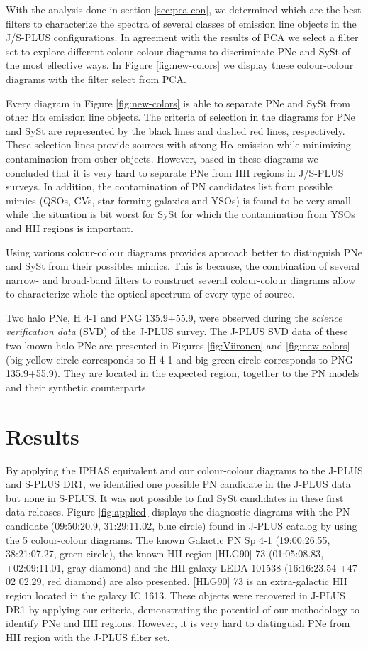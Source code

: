 \documentclass{article}
\newcommand\ha{\ensuremath{\mathrm{H\alpha}}}
\begin{document}
 With the analysis done in section \ref{sec:pca-con}, we determined which are the best filters to characterize the spectra of several classes of emission line objects in the J/S-PLUS configurations. In agreement with the results of PCA we select a filter set to explore different colour-colour diagrams to discriminate PNe and SySt of the most effective ways. In Figure \ref{fig:new-colors} we display these colour-colour diagrams with the filter select from PCA.

Every diagram in Figure \ref{fig:new-colors} is able to separate  PNe and SySt from other \ha{} emission line objects. The criteria of selection in the diagrams for PNe and SySt are represented by the black lines and  dashed red lines, respectively. These selection lines provide sources with strong \ha{} emission while minimizing contamination from other objects. However, based in these diagrams we concluded that it is very hard to separate PNe from HII regions in J/S-PLUS surveys. In addition, the contamination of PN candidates list from possible mimics (QSOs, CVs, star forming galaxies and YSOs) is found to be very small while the situation is bit worst for SySt for which the contamination from YSOs and HII regions is important.

 Using various colour-colour diagrams provides approach better to distinguish PNe and SySt from their possibles mimics. This is because, the combination of several  narrow- and broad-band filters to construct several colour-colour diagrams allow to characterize whole the optical spectrum of every type of source. 

Two halo PNe, H 4-1 and PNG 135.9+55.9, were observed during the \textit{science verification data} (SVD) of the J-PLUS survey. The J-PLUS SVD data of these two known halo PNe are presented in Figures \ref{fig:Viironen} and \ref{fig:new-colors} (big yellow circle corresponds to H 4-1 and  big green circle corresponds to PNG 135.9+55.9). They are located in the expected region, together to the PN models and their synthetic counterparts.

\section{Results }
\label{sec:serch}

By applying the IPHAS equivalent and our colour-colour diagrams to the J-PLUS and S-PLUS DR1, we identified one possible PN candidate in the J-PLUS data but none in S-PLUS. It was not possible to find SySt candidates in these first data releases. Figure \ref{fig:applied} displays the diagnostic diagrams with the PN candidate (09:50:20.9, 31:29:11.02, blue circle) found in J-PLUS catalog by using the 5 colour-colour diagrams. The known Galactic PN Sp 4-1
(19:00:26.55, 38:21:07.27, green circle), the known HII region [HLG90] 73 (01:05:08.83, +02:09:11.01, gray diamond) and the HII galaxy LEDA 101538  (16:16:23.54 +47 02 02.29, red diamond) are also presented. [HLG90] 73 is an extra-galactic HII region located in the galaxy IC 1613. These objects were recovered in J-PLUS DR1 by applying our criteria, demonstrating  the potential of our methodology to identify PNe and HII regions. However, it is very hard to distinguish PNe from HII region with the J-PLUS filter set. 
\end{document}

